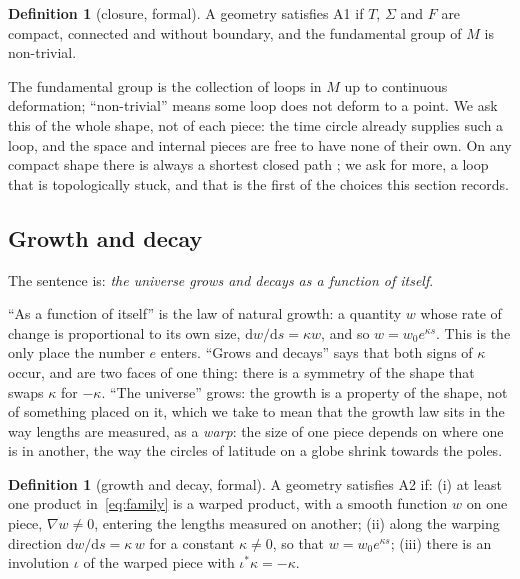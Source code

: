 \documentclass[11pt,a4paper]{article}
\theoremstyle{plain}
\theoremstyle{definition}
\newtheorem{definition}[theorem]{Definition}
\theoremstyle{remark}
\begin{document}
\begin{definition}[closure, formal]\label{def:A1}
A geometry satisfies A1 if $T$, $\Sigma$ and $F$ are compact, connected and without boundary, and the fundamental group of $M$ is non-trivial.
\end{definition}

The fundamental group is the collection of loops in $M$ up to continuous deformation; ``non-trivial'' means some loop does not deform to a point. We ask this of the whole shape, not of each piece: the time circle already supplies such a loop, and the space and internal pieces are free to have none of their own. On any compact shape there is always a shortest closed path \cite{LyusternikFet}; we ask for more, a loop that is topologically stuck, and that is the first of the choices this section records.

\subsection{Growth and decay}\label{sec:A2}

The sentence is: \emph{the universe grows and decays as a function of itself}.

``As a function of itself'' is the law of natural growth: a quantity $w$ whose rate of change is proportional to its own size, $\mathrm{d}w/\mathrm{d}s=\kappa w$, and so $w=w_{0}e^{\kappa s}$. This is the only place the number $e$ enters. ``Grows and decays'' says that both signs of $\kappa$ occur, and are two faces of one thing: there is a symmetry of the shape that swaps $\kappa$ for $-\kappa$. ``The universe'' grows: the growth is a property of the shape, not of something placed on it, which we take to mean that the growth law sits in the way lengths are measured, as a \emph{warp}: the size of one piece depends on where one is in another, the way the circles of latitude on a globe shrink towards the poles.

\begin{definition}[growth and decay, formal]\label{def:A2}
A geometry satisfies A2 if: (i) at least one product in~\eqref{eq:family} is a warped product, with a smooth function $w$ on one piece, $\nabla w\neq0$, entering the lengths measured on another; (ii) along the warping direction $\mathrm{d}w/\mathrm{d}s=\kappa\,w$ for a constant $\kappa\neq0$, so that $w=w_{0}e^{\kappa s}$; (iii) there is an involution $\iota$ of the warped piece with $\iota^{*}\kappa=-\kappa$.
\end{definition}
\end{document}
